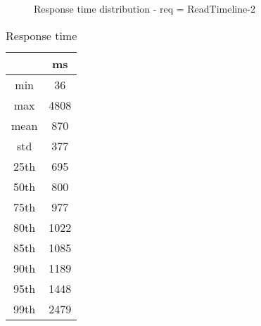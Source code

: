 \begin{minipage}{0.75\linewidth}
\begin{figure}[h]
\begin{adjustbox}{max width=1.0\linewidth, keepaspectratio}
  \end{adjustbox}
  \caption{Response time distribution - req = ReadTimeline-2}
\end{figure}
\end{minipage}\hfill\begin{minipage}{0.18\linewidth}
\begin{table}[h]
\begin{tabular}{|cc|}
\hline
\textbf{} & \textbf{ms}\\ \hline
 \Xhline{0.005\arrayrulewidth}
min & 36\\
 \Xhline{0.005\arrayrulewidth}
max & 4808\\
 \Xhline{0.005\arrayrulewidth}
mean & 870\\
 \Xhline{0.005\arrayrulewidth}
std & 377\\
\hline
\hline
 \Xhline{0.005\arrayrulewidth}
25th & 695\\
 \Xhline{0.005\arrayrulewidth}
50th & 800\\
 \Xhline{0.005\arrayrulewidth}
75th & 977\\
 \Xhline{0.005\arrayrulewidth}
80th & 1022\\
 \Xhline{0.005\arrayrulewidth}
85th & 1085\\
 \Xhline{0.005\arrayrulewidth}
90th & 1189\\
 \Xhline{0.005\arrayrulewidth}
95th & 1448\\
 \Xhline{0.005\arrayrulewidth}
99th & 2479\\
\hline
\end{tabular}
\caption{Response time}
\end{table}
\end{minipage}\hfill